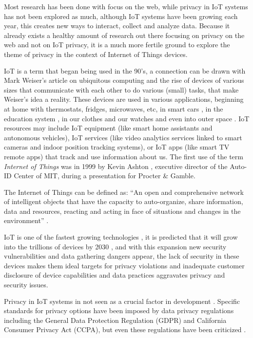 \documentclass[conference]{IEEEtran}
\begin{document}
Most research has been done with focus on the web, while privacy in IoT
systems has not been explored as much, although IoT systems have been
growing each year, this creates new ways to interact,
collect and analyze data.
Because it already exists a healthy amount of research out there
focusing on privacy on the web and not on IoT privacy, it is a much more
fertile ground to explore the theme of privacy in the context of
Internet of Things devices.

IoT is a term that began being used in the 90's, a connection can be drawn
with Mark Weiser's article on ubiquitous computing \cite{weiser1991computer} and the rise
of devices of various sizes that communicate with each other to do
various (small) tasks, that make Weiser's idea a reality. These devices are
used in various applications, beginning at home \cite{marikyan2019systematic} with thermostats,
fridges, microwaves, etc, in smart cars \cite{arena2020overview}, in the education system \cite{al2020survey},
in our clothes and our watches \cite{niknejad2020comprehensive} and even into outer space \cite{AkyildizInternet}.
IoT resources may include IoT equipment (like smart home assistants and
autonomous vehicles), IoT services (like video analytics services linked to
smart cameras and indoor position tracking systems), or IoT apps
(like smart TV remote apps) that track and use information about us.
The first use of the term \textit{Internet of Things} was in 1999 by Kevin Ashton \cite{KevinThat},
executive director of the Auto-ID Center of MIT, during a presentation for Procter \& Gamble.

The Internet of Things can be defined as: ``An open and
comprehensive network of intelligent objects that have the capacity to auto-organize,
share information, data and resources, reacting and acting in face of situations
and changes in the environment'' \cite{madakam2015internet}.

IoT is one of the fastest growing technologies \cite{MohammadState},
it is predicted that it will grow into the trillions of devices by 2030 \cite{SarawiInternet},
and with this expansion new security vulnerabilities and data gathering dangers appear, the lack
of security in these devices makes them ideal targets for privacy violations and inadequate
customer disclosure of device capabilities and data practices aggravates
privacy and security issues.

Privacy in IoT systems in not seen as a crucial factor in development \cite{alhirabi2021security}.
Specific standards for privacy options have been imposed by
data privacy regulations including the General Data Protection Regulation (GDPR)
and California Consumer Privacy Act (CCPA), but even these regulations have
been criticized \cite{peloquin2020disruptive, gladis2022weaponizing, gentile2022deficient, green2022flaws, byun2019privacy}.
\end{document}
